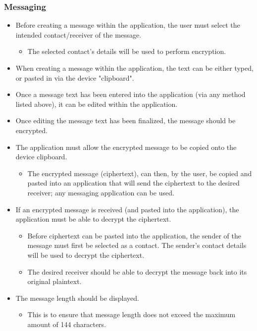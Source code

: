 \subsubsection{Messaging}
\begin{itemize}
\item Before creating a message within the application, the user must select the intended contact/receiver of the message.
\begin{itemize}
\item The selected contact's details will be used to perform encryption.
\end{itemize}
\item When creating a message within the application, the text can be either typed, or pasted in via the device "clipboard".
\item Once a message text has been entered into the application (via any method listed above), it can be edited within the application.
\item Once editing the message text has been finalized, the message should be encrypted.
\item The application must allow the encrypted message to be copied onto the device clipboard.
\begin{itemize}
\item The encrypted message (ciphertext), can then, by the user, be copied and pasted into an application that will send the ciphertext to the desired receiver; any messaging application can be used.
\end{itemize}
\item If an encrypted message is received (and pasted into the application), the application must be able to decrypt the ciphertext.
\begin{itemize}
\item Before ciphertext can be pasted into the application, the sender of the message must first be selected as a contact. The sender's contact details will be used to decrypt the ciphertext.
\item The desired receiver should be able to decrypt the message back into its original plaintext.
\end{itemize}
\item The message length should be displayed.
\begin{itemize}
\item This is to ensure that message length does not exceed the maximum amount of 144 characters.
\end{itemize}
\end{itemize}

